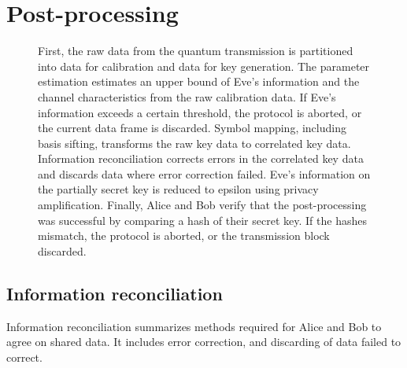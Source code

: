 \section{Post-processing}




\begin{figure}[htb]
	\centering
	
	\caption{First, the raw data from the quantum transmission is partitioned into data for calibration and data for key generation. The parameter estimation estimates an upper bound of Eve's information and the channel characteristics from the raw calibration data. If Eve's information exceeds a certain threshold, the protocol is aborted, or the current data frame is discarded. Symbol mapping, including basis sifting, transforms the raw key data to correlated key data. Information reconciliation corrects errors in the correlated key data and discards data where error correction failed. Eve's information on the partially secret key is reduced to epsilon using privacy amplification. Finally, Alice and Bob verify that the post-processing was successful by comparing a hash of their secret key. If the hashes mismatch, the protocol is aborted, or the transmission block discarded.}\label{fig:post_processing}
\end{figure}

\cite{Silberhorn2002} %
\cite{Fung2010} %

\cite{Leverrier2008} %
\cite{Elkouss2011} %

\FloatBarrier
\subsection{Information reconciliation}

Information reconciliation summarizes methods required for Alice and Bob to agree on shared data.
It includes error correction, and discarding of data failed to correct.

